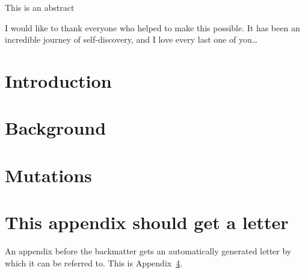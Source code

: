 \documentclass[a4paper,11pt,bcshonoursthesis,singlespace,twoside]{cssethesis}
\begin{document}
\frontmatter					%

\thesistitlepage				%
\thesiscopyrightpage			%
\thesisdedicationpage			%
\tableofcontents				%
\listoftables					%
\listoffigures					%

\begin{thesisabstract}			%
This is an abstract
\end{thesisabstract}                 

\thesisdeclarationpage			%

\begin{thesisacknowledgments}	%
I would like to thank everyone who helped to make this possible. It has
been an incredible journey of self-discovery, and I love every last one of
you\ldots
\end{thesisacknowledgments}   

\mainmatter						%

\chapter{Introduction}

\chapter{Background}

\chapter{Mutations}

\appendix %


\chapter{This appendix should get a letter}
\label{app:example}
An appendix before the backmatter gets an automatically generated letter by
which it can be referred to. This is Appendix~\ref{app:example}.
\end{document}
